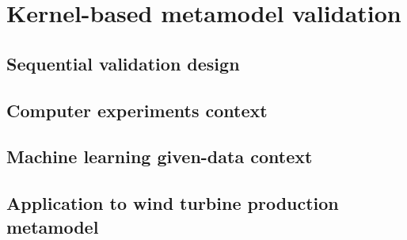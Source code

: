 \chapter{Kernel-based metamodel validation}
    \section{Sequential validation design}
    \section{Computer experiments context}
    \section{Machine learning given-data context}
    \section{Application to wind turbine production metamodel}